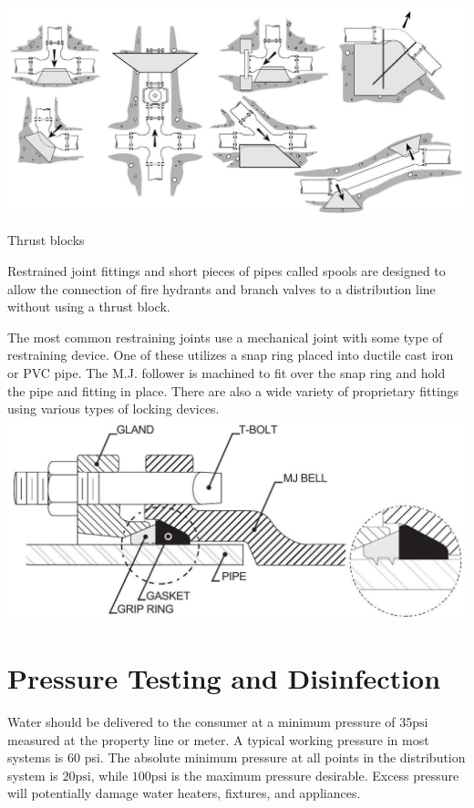\documentclass[10pt]{article}
\begin{document}
\includegraphics[max width=\textwidth]{ThrustBlocks}

Thrust blocks

Restrained joint fittings and short pieces of pipes called spools are designed to allow the connection of fire hydrants and branch valves to a distribution line without using a thrust block.

The most common restraining joints use a mechanical joint with some type of restraining device. One of these utilizes a snap ring placed into ductile cast iron or PVC pipe. The M.J. follower is machined to fit over the snap ring and hold the pipe and fitting in place. There are also a wide variety of proprietary fittings using various types of locking devices.\\

\includegraphics[max width=\textwidth]{2022_11_03_fc0cbc2f3612fab6edd2g-13}

\section{Pressure Testing and Disinfection}
Water should be delivered to the consumer at a minimum pressure of $35 \mathrm{psi}$ measured at the property line or meter. A typical working pressure in most systems is 60 psi. The absolute minimum pressure at all points in the distribution system is $20 \mathrm{psi}$, while $100 \mathrm{psi}$ is the maximum pressure desirable. Excess pressure will potentially damage water heaters, fixtures, and appliances.
\end{document}
